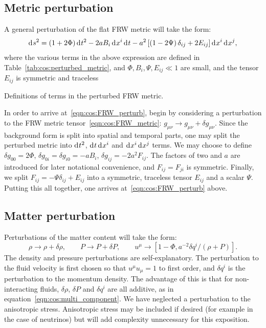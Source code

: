 \subsection{Metric perturbation}
A general perturbation of the flat FRW metric will take the form:
\begin{equation}
  \operatorname{d}^{}\!{s}^2 = (1+2\Phi)\operatorname{d}^{}\!{t}^2 -2a B_i \operatorname{d}^{}\!{x}^i \operatorname{d}^{}\!{t}  -a^2 \left[ \left( 1 - 2 \Psi \right)\delta_{ij} + 2E_{ij} \right] \operatorname{d}^{}\!{x}^i \operatorname{d}^{}\!{x}^j,
  \label{eqn:cos:FRW_perturb}
\end{equation}
where the various terms in the above expression are defined in Table~\ref{tab:cos:perturbed_metric}, and \({\Phi,B_i,\Psi,E_{ij}\ll1}\) are small, and the tensor \(E_{ij}\) is symmetric and traceless
\begin{table}[tp]
  \centering
  
  \caption{Definitions of terms in the perturbed FRW metric.}\label{tab:cos:perturbed_metric}
\end{table}

In order to arrive at~\eqref{eqn:cos:FRW_perturb}, begin by considering a perturbation to the FRW metric tensor~\eqref{eqn:cos:FRW_metric}: \({g_{\mu\nu} \rightarrow g_{\mu\nu} + \delta g_{\mu\nu}}\). Since the background form is split into spatial and temporal parts, one may split the perturbed metric into \(\operatorname{d}^{}\!{t}^2\), \(\operatorname{d}^{}\!{t}\operatorname{d}^{}\!{x^i}\) and \(\operatorname{d}^{}\!{x^i}\operatorname{d}^{}\!{x^j}\) terms. We may choose to define \({\delta g_{00} = 2\Phi}\), \({\delta g_{0i} = \delta g_{i0} = -a B_i}\), \({\delta g_{ij} = -2a^2F_{ij}}\). The factors of two and \(a\) are introduced for later notational convenience, and \({F_{ij} = F_{ji}}\) is symmetric. Finally, we split \({F_{ij} = -\Psi\delta_{ij} + E_{ij}}\) into a symmetric, traceless tensor \(E_{ij}\) and a scalar \(\Psi\). Putting this all together, one arrives at~\eqref{eqn:cos:FRW_perturb} above.

\subsection{Matter perturbation}
Perturbations of the matter content will take the form:
\begin{equation}
  \rho \rightarrow \rho + \delta \rho, \qquad 
  P \rightarrow P + \delta P, \qquad
  u^\mu \rightarrow \left[ 1-\Phi, a^{-2} \delta q^i/(\rho+P)\right].
  \label{eqn:cos:matter_perturb}
\end{equation}
The density and pressure perturbations are self-explanatory. The perturbation to the fluid velocity is first chosen so that \(u^\mu u_\mu=1\) to first order, and \(\delta q^i\) is the perturbation to the momentum density. The advantage of this is that for non-interacting fluids, \(\delta\rho\), \(\delta P\) and \(\delta q^i\) are all additive, as in equation~\eqref{eqn:cos:multi_component}. We have neglected a perturbation to the anisotropic stress. Anisotropic stress may be included if desired (for example in the case of neutrinos) but will add complexity unnecessary for this exposition. 

